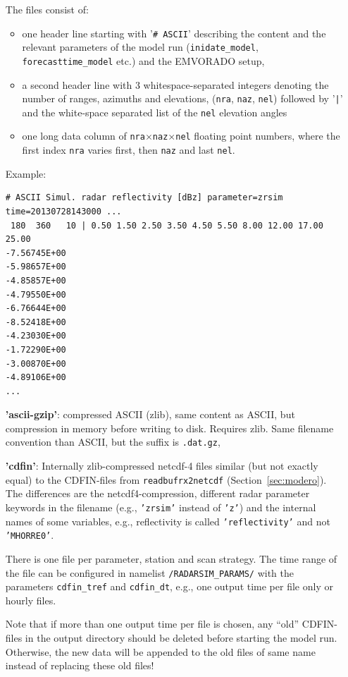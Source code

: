 \documentclass[10pt,a4paper,twoside,headinclude,footinclude,parskip=half]{scrartcl}
\newcommand{\srcform}[1]{\mbox{\texttt{#1}}\xspace}%
\begin{document}
\begin{itemize}
    The files consist of:
    \begin{itemize}
    \item one header line starting with '\srcform{\# ASCII}' describing the content and the relevant parameters of the model
      run (\srcform{inidate_model}, \srcform{forecasttime_model} etc.) and the EMVORADO setup,
    \item a second header line with 3 whitespace-separated integers denoting the number of ranges, azimuths and elevations,
      (\srcform{nra}, \srcform{naz}, \srcform{nel}) followed by '\verb+|+' and the white-space separated list of the \srcform{nel} elevation angles
    \item one long data column of \srcform{nra}$\times$\srcform{naz}$\times$\srcform{nel}
      floating point numbers, where the first index \srcform{nra} varies first, then \srcform{naz} and last \srcform{nel}.
    \end{itemize}
    Example:
\begin{verbatim}
# ASCII Simul. radar reflectivity [dBz] parameter=zrsim time=20130728143000 ...
 180  360   10 | 0.50 1.50 2.50 3.50 4.50 5.50 8.00 12.00 17.00 25.00
-7.56745E+00
-5.98657E+00
-4.85857E+00
-4.79550E+00
-6.76644E+00
-8.52418E+00
-4.23030E+00
-1.72290E+00
-3.00870E+00
-4.89106E+00
...
\end{verbatim}
  \item[\textbf{'ascii-gzip'}:] compressed ASCII (zlib), same content as ASCII, but compression in memory before writing to disk.
    Requires zlib. Same filename convention than ASCII, but the suffix is \verb|.dat.gz|,
  \item[\textbf{'cdfin'}:] Internally zlib-compressed netcdf-4 files similar (but not exactly equal) to the CDFIN-files from \srcform{readbufrx2netcdf} (Section~\ref{sec:modero}). The differences are the netcdf4-compression, different radar parameter keywords in the filename (e.g., \srcform{'zrsim'} instead of \srcform{'z'}) and the internal names of some variables, e.g., reflectivity is called \srcform{'reflectivity'} and not \srcform{'MHORRE0'}.

    There is one file per parameter, station and scan strategy. The time range of
    the file can be configured in namelist \srcform{/RADARSIM\_PARAMS/} with the parameters \srcform{cdfin\_tref} and \srcform{cdfin\_dt},
    e.g., one output time per file only or hourly files.

    Note that if more than one output time per file is chosen, any ``old'' CDFIN-files in the output directory should
    be deleted before starting the model run. Otherwise, the new data will be appended to the old files of
    same name instead of replacing these old files!


\end{itemize}
\end{document}
